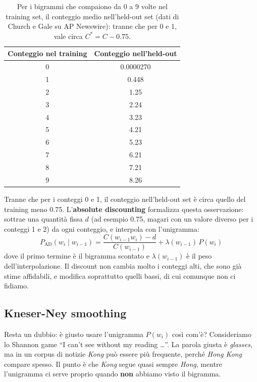 \begin{table}[htbp]
\centering
\begin{tabular}{cc}
\toprule
Conteggio nel training & Conteggio nell'held-out \\
\midrule
0 & 0.0000270 \\
1 & 0.448 \\
2 & 1.25 \\
3 & 2.24 \\
4 & 3.23 \\
5 & 4.21 \\
6 & 5.23 \\
7 & 6.21 \\
8 & 7.21 \\
9 & 8.26 \\
\bottomrule
\end{tabular}
\caption{Per i bigrammi che compaiono da 0 a 9 volte nel training set, il conteggio medio nell'held-out set (dati di Church e Gale su AP Newswire): tranne che per 0 e 1, vale circa $C^* = C - 0.75$.}
\label{tab:church-gale}
\end{table}

Tranne che per i conteggi 0 e 1, il conteggio nell'held-out set è circa quello del training meno 0.75. L'\textbf{absolute discounting} formalizza questa osservazione: sottrae una quantità fissa $d$ (ad esempio 0.75, magari con un valore diverso per i conteggi 1 e 2) da ogni conteggio, e interpola con l'unigramma:
\begin{equation}
P_{\text{AD}}(w_i \mid w_{i-1}) = \frac{C(w_{i-1} w_i) - d}{C(w_{i-1})} + \lambda(w_{i-1})\, P(w_i)
\end{equation}
dove il primo termine è il bigramma scontato e $\lambda(w_{i-1})$ è il peso dell'interpolazione. Il discount non cambia molto i conteggi alti, che sono già stime affidabili, e modifica soprattutto quelli bassi, di cui comunque non ci fidiamo.

\subsection{Kneser-Ney smoothing}
Resta un dubbio: è giusto usare l'unigramma $P(w_i)$ così com'è? Consideriamo lo Shannon game \enquote{I can't see without my reading \dots}. La parola giusta è \textit{glasses}, ma in un corpus di notizie \textit{Kong} può essere più frequente, perché \textit{Hong Kong} compare spesso. Il punto è che \textit{Kong} segue quasi sempre \textit{Hong}, mentre l'unigramma ci serve proprio quando \textbf{non} abbiamo visto il bigramma.

